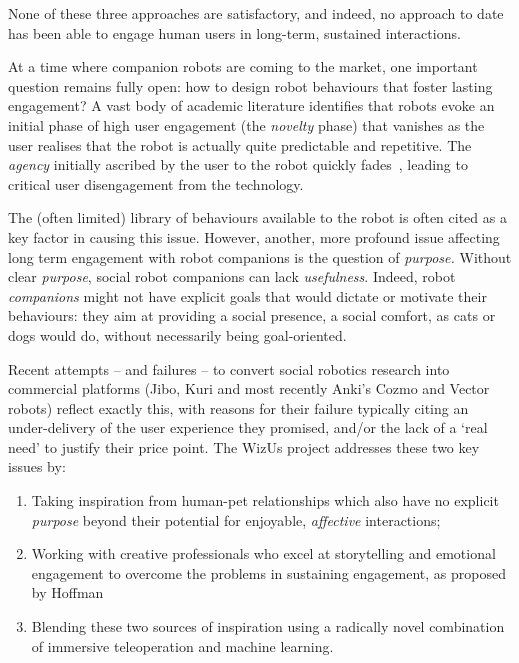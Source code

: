\documentclass[11pt,a4paper]{report}
\newcommand{\project}{WizUs\xspace}
\begin{document}
None of these three approaches are satisfactory, and indeed, no approach to date
has been able to engage human users in long-term, sustained interactions.




At a time where companion robots are coming to the market, one important
question remains fully open: how to design robot behaviours that foster
lasting engagement? A vast body of academic literature identifies that
robots evoke an initial phase of high user engagement (the
\emph{novelty} phase) that vanishes as the user realises that the robot
is actually quite predictable and repetitive. The \emph{agency}
initially ascribed by the user to the robot quickly
fades~\cite{lemaignan2014dynamics}, leading to critical user disengagement from the technology.


The (often limited) library of behaviours available to the robot is
often cited as a key factor in causing this issue. However, another,
more profound issue affecting long term engagement with robot companions
is the question of \emph{purpose.} Without clear \emph{purpose}, social
robot companions can lack \emph{usefulness}. Indeed, robot
\emph{companions} might not have explicit goals that would dictate or
motivate their behaviours: they aim at providing a social presence, a
social comfort, as cats or dogs would do, without necessarily being
goal-oriented.

Recent attempts -- and failures -- to convert social robotics research
into commercial platforms (Jibo, Kuri and most recently Anki's Cozmo and
Vector robots) reflect exactly this, with reasons for their failure
typically citing an under-delivery of the user experience they promised,
and/or the lack of a `real need' to justify their price point. The
\project project addresses these two key issues by:

\begin{enumerate}
\def\labelenumi{\arabic{enumi}.}
\item
  Taking inspiration from human-pet relationships which also have no
  explicit \emph{purpose} beyond their potential for enjoyable,
  \emph{affective} interactions;
\item
  Working with creative professionals who excel at storytelling and
  emotional engagement to overcome the problems in sustaining
        engagement, as proposed by Hoffman~\cite{hoffman2019anki}
\item
  Blending these two sources of inspiration using a radically novel
  combination of immersive teleoperation and machine learning.
\end{enumerate}
\end{document}
